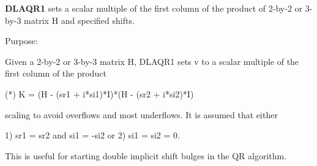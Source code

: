 {\bfseries D\+L\+A\+Q\+R1} sets a scalar multiple of the first column of the product of 2-\/by-\/2 or 3-\/by-\/3 matrix H and specified shifts. 

 \begin{DoxyParagraph}{Purpose\+: }
\begin{DoxyVerb}      Given a 2-by-2 or 3-by-3 matrix H, DLAQR1 sets v to a
      scalar multiple of the first column of the product

      (*)  K = (H - (sr1 + i*si1)*I)*(H - (sr2 + i*si2)*I)

      scaling to avoid overflows and most underflows. It
      is assumed that either

              1) sr1 = sr2 and si1 = -si2
          or
              2) si1 = si2 = 0.

      This is useful for starting double implicit shift bulges
      in the QR algorithm.\end{DoxyVerb}
 
\end{DoxyParagraph}

